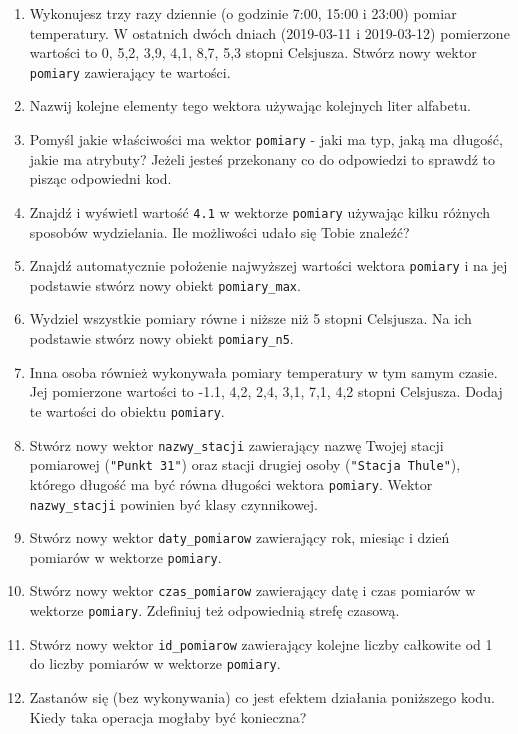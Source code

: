 \documentclass[paper=6in:9in,pagesize=pdftex,headinclude=on,footinclude=on,10pt]{scrbook}
\providecommand{\tightlist}{%
  \setlength{\itemsep}{0pt}\setlength{\parskip}{0pt}}
\begin{document}
\begin{enumerate}
\def\labelenumi{\arabic{enumi})}
\tightlist
\item
  Wykonujesz trzy razy dziennie (o godzinie 7:00, 15:00 i 23:00) pomiar temperatury.
  W ostatnich dwóch dniach (2019-03-11 i 2019-03-12) pomierzone wartości to 0, 5,2, 3,9, 4,1, 8,7, 5,3 stopni Celsjusza.
  Stwórz nowy wektor \texttt{pomiary} zawierający te wartości.
\item
  Nazwij kolejne elementy tego wektora używając kolejnych liter alfabetu.
\item
  Pomyśl jakie właściwości ma wektor \texttt{pomiary} - jaki ma typ, jaką ma długość, jakie ma atrybuty?
  Jeżeli jesteś przekonany co do odpowiedzi to sprawdź to pisząc odpowiedni kod.
\item
  Znajdź i wyświetl wartość \texttt{4.1} w wektorze \texttt{pomiary} używając kilku różnych sposobów wydzielania.
  Ile możliwości udało się Tobie znaleźć?
\item
  Znajdź automatycznie położenie najwyższej wartości wektora \texttt{pomiary} i na jej podstawie stwórz nowy obiekt \texttt{pomiary\_max}.
\item
  Wydziel wszystkie pomiary równe i niższe niż 5 stopni Celsjusza. Na ich podstawie stwórz nowy obiekt \texttt{pomiary\_n5}.
\item
  Inna osoba również wykonywała pomiary temperatury w tym samym czasie.
  Jej pomierzone wartości to -1.1, 4,2, 2,4, 3,1, 7,1, 4,2 stopni Celsjusza.
  Dodaj te wartości do obiektu \texttt{pomiary}.
\item
  Stwórz nowy wektor \texttt{nazwy\_stacji} zawierający nazwę Twojej stacji pomiarowej (\texttt{"Punkt\ 31"}) oraz stacji drugiej osoby (\texttt{"Stacja\ Thule"}), którego długość ma być równa długości wektora \texttt{pomiary}.
  Wektor \texttt{nazwy\_stacji} powinien być klasy czynnikowej.
\item
  Stwórz nowy wektor \texttt{daty\_pomiarow} zawierający rok, miesiąc i dzień pomiarów w wektorze \texttt{pomiary}.
\item
  Stwórz nowy wektor \texttt{czas\_pomiarow} zawierający datę i czas pomiarów w wektorze \texttt{pomiary}.
  Zdefiniuj też odpowiednią strefę czasową.
\item
  Stwórz nowy wektor \texttt{id\_pomiarow} zawierający kolejne liczby całkowite od 1 do liczby pomiarów w wektorze \texttt{pomiary}.
\item
  Zastanów się (bez wykonywania) co jest efektem działania poniższego kodu.
  Kiedy taka operacja mogłaby być konieczna?
\end{enumerate}
\end{document}
